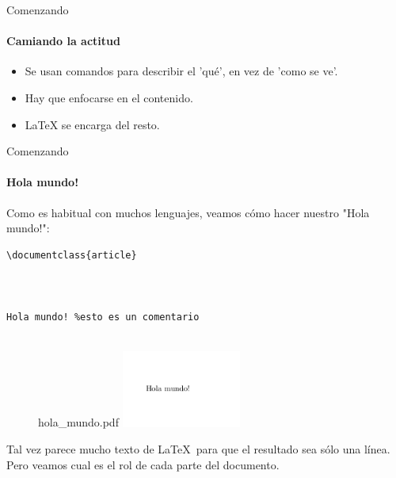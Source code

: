 
\begin{frame}[fragile]{Comenzando}
    \framesubtitle{Camiando la actitud}
    \begin{itemize}
        \item Se usan comandos para describir el 'qué', en vez de 'como se ve'.
        \item Hay que enfocarse en el contenido.
        \item \LaTeX{} se encarga del resto.
        
    \end{itemize}

    
\end{frame}

\begin{frame}[fragile]{Comenzando}
\framesubtitle{Hola mundo!}

Como es habitual con muchos lenguajes, veamos cómo hacer nuestro "Hola mundo!":

\begin{multicols}{2}
\begin{lstlisting}[title={hola\_mundo.tex}]
\documentclass{article}



Hola mundo! %esto es un comentario


\end{lstlisting}

\begin{figure}
hola\_mundo.pdf
\includegraphics[width=0.35\textwidth]{../images/ejemplo_hola_mundo.png}
\end{figure}

\end{multicols}
\pause
Tal vez parece mucho texto de \LaTeX\ para que el resultado sea sólo una línea. Pero veamos cual es el rol de cada parte del documento.

\end{frame}

